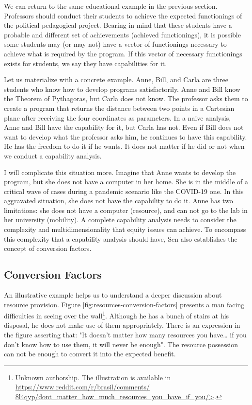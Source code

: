 We can return to the same educational example in the previous section. Professors should conduct their students to achieve the expected functionings of the political pedagogical project. Bearing in mind that these students have a probable and different set of achievements (achieved functionings), it is possible some students may (or may not) have a vector of functionings necessary to achieve what is required by the program. If this vector of necessary functionings exists for students, we say they have capabilities for it.

Let us materialize with a concrete example. Anne, Bill, and Carla are three students who know how to develop programs satisfactorily. Anne and Bill know the Theorem of Pythagoras, but Carla does not know. The professor asks them to create a program that returns the distance between two points in a Cartesian plane after receiving the four coordinates as parameters. In a naive analysis, Anne and Bill have the capability for it, but Carla has not. Even if Bill does not want to develop what the professor asks him, he continues to have this capability. He has the freedom to do it if he wants. It does not matter if he did or not when we conduct a capability analysis.

I will complicate this situation more. Imagine that Anne wants to develop the program, but she does not have a computer in her home. She is in the middle of a critical wave of cases during a pandemic scenario like the \gls{COVID-19} one. In this aggravated situation, she does not have the capability to do it. Anne has two limitations: she does not have a computer (resource), and can not go to the lab in her university (mobility). A complete capability analysis needs to consider the complexity and multidimensionality that equity issues can achieve. To encompass this complexity that a capability analysis should have, Sen also establishes the concept of conversion factors.

\subsection{Conversion Factors}
\label{sen-ss:conv-fac}

An illustrative example helps us to understand a deeper discussion about resource provision. Figure \ref{fig:resources-conversion-factors} presents a man facing difficulties in seeing over the wall\footnote{Unknown authorship. The illustration is available in \url{https://www.reddit.com/r/brasil/comments/ 8l4qyp/dont_matter_how_much_resources_you_have_if_you/>}.}. Although he has a bunch of stairs at his disposal, he does not make use of them appropriately. There is an expression in the figure asserting that: "It doesn't matter how many resources you have… if you don't know how to use them, it will never be enough". The resource possession can not be enough to convert it into the expected benefit. 

